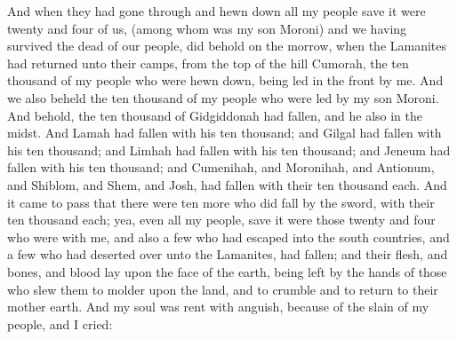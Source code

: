 And when they had gone through and hewn down all my people save it were twenty and four of us, (among whom was my son Moroni) and we having survived the dead of our people, did behold on the morrow, when the Lamanites had returned unto their camps, from the top of the hill Cumorah, the ten thousand of my people who were hewn down, being led in the front by me.
\bverse \iffalse And we also beheld the ten thousand of my people who were led by my son Moroni. \fi
And we also beheld the ten thousand of my people who were led by my son Moroni.
\bverse \iffalse And behold, the ten thousand of Gidgiddonah had fallen, and he also in the midst. \fi
And behold, the ten thousand of Gidgiddonah had fallen, and he also in the midst.
\bverse \iffalse And Lamah had fallen with his ten thousand; and Gilgal had fallen with his ten thousand; and Limhah had fallen with his ten thousand; and Jeneum had fallen with his ten thousand; and Cumenihah, and Moronihah, and Antionum, and Shiblom, and Shem, and Josh, had fallen with their ten thousand each. \fi
And Lamah had fallen with his ten thousand; and Gilgal had fallen with his ten thousand; and Limhah had fallen with his ten thousand; and Jeneum had fallen with his ten thousand; and Cumenihah, and Moronihah, and Antionum, and Shiblom, and Shem, and Josh, had fallen with their ten thousand each.
\bverse \iffalse And it came to pass that there were ten more who did fall by the sword, with their ten thousand each; yea, even all my people, save it were those twenty and four who were with me, and also a few who had escaped into the south countries, and a few who had deserted over unto the Lamanites, had fallen; and their flesh, and bones, and blood lay upon the face of the earth, being left by the hands of those who slew them to molder upon the land, and to crumble and to return to their mother earth. \fi
And it came to pass that there were ten more who did fall by the sword, with their ten thousand each; yea, even all my people, save it were those twenty and four who were with me, and also a few who had escaped into the south countries, and a few who had deserted over unto the Lamanites, had fallen; and their flesh, and bones, and blood lay upon the face of the earth, being left by the hands of those who slew them to molder upon the land, and to crumble and to return to their mother earth.
\bverse \iffalse And my soul was rent with anguish, because of the slain of my people, and I cried: \fi
And my soul was rent with anguish, because of the slain of my people, and I cried:
